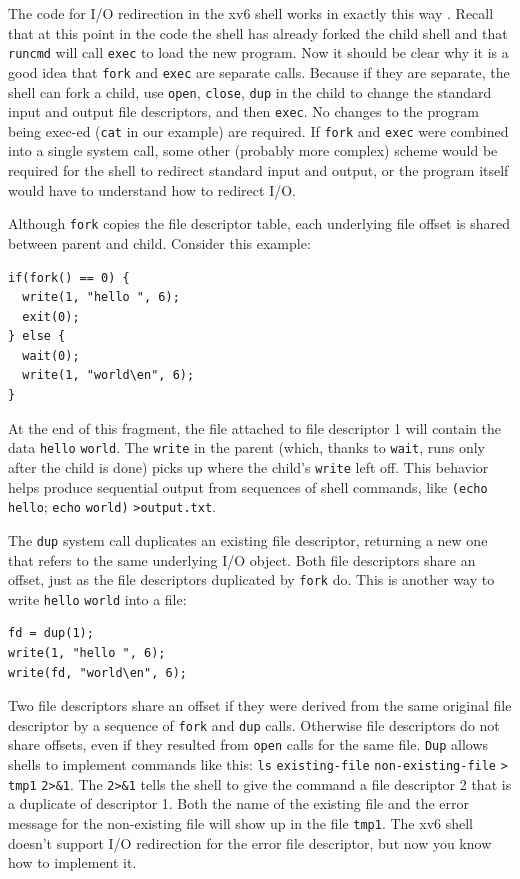 The code for I/O redirection in the xv6 shell works in exactly this way
.
Recall that at this point in the code the shell has already forked the
child shell and that 
\lstinline{runcmd} 
will call
\lstinline{exec}
to load the new program.  Now it should be clear why it is a good idea that
\lstinline{fork}
and 
\lstinline{exec} 
are separate calls.  Because if they are separate, the shell can fork a child,
use
\lstinline{open},
\lstinline{close},
\lstinline{dup}
in the child to change the standard input and output
file descriptors, and then
\lstinline{exec}.
No changes to the program being exec-ed
(\lstinline{cat}
in our example)
are required.
If
\lstinline{fork}
and
\lstinline{exec}
were combined into a single
system call, some other (probably more complex) scheme would be required for the
shell to redirect standard input and output, or the program itself would have to
understand how to redirect I/O.

Although
\lstinline{fork}
copies the file descriptor table, each underlying file offset is shared
between parent and child.
Consider this example:
\begin{lstlisting}[]
if(fork() == 0) {
  write(1, "hello ", 6);
  exit(0);
} else {
  wait(0);
  write(1, "world\en", 6);
}
\end{lstlisting}
At the end of this fragment, the file attached to file descriptor 1
will contain the data
\lstinline{hello}
\lstinline{world}.
The
\lstinline{write}
in the parent
(which, thanks to
\lstinline{wait},
runs only after the child is done)
picks up where the child's
\lstinline{write}
left off.
This behavior helps produce sequential output from sequences
of shell commands, like
\lstinline{(echo}
\lstinline{hello};
\lstinline{echo}
\lstinline{world)}
\lstinline{>output.txt}.

The
\lstinline{dup}
system call duplicates an existing file descriptor,
returning a new one that refers to the same underlying I/O object.
Both file descriptors share an offset, just as the file descriptors
duplicated by
\lstinline{fork}
do.
This is another way to write
\lstinline{hello}
\lstinline{world}
into a file:
\begin{lstlisting}[]
fd = dup(1);
write(1, "hello ", 6);
write(fd, "world\en", 6);
\end{lstlisting}

Two file descriptors share an offset if they were derived from
the same original file descriptor by a sequence of
\lstinline{fork}
and
\lstinline{dup}
calls.
Otherwise file descriptors do not share offsets, even if they
resulted from 
\lstinline{open}
calls for the same file.  
\lstinline{Dup} 
allows shells to implement commands like this:
\lstinline{ls}
\lstinline{existing-file}
\lstinline{non-existing-file}
\lstinline{>}
\lstinline{tmp1}
\lstinline{2>&1}.
The
\lstinline{2>&1}
tells the shell to give the command a file descriptor 2 that
is a duplicate of descriptor 1.
Both the name of the existing file and the error message for the
non-existing file will show up in the file
\lstinline{tmp1}.
The xv6 shell doesn't support I/O redirection for the error file
descriptor, but now you know how to implement it.

